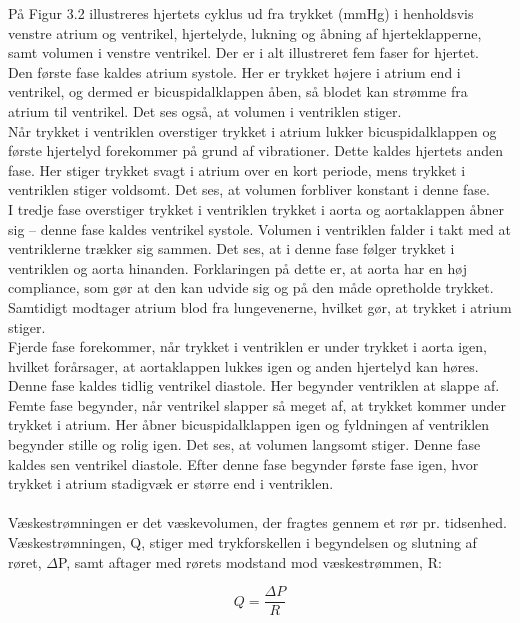 På Figur 3.2 illustreres hjertets cyklus ud fra trykket (mmHg) i henholdsvis venstre atrium og ventrikel, hjertelyde, lukning og åbning af hjerteklapperne, samt volumen i venstre ventrikel. Der er i alt illustreret fem faser for hjertet. \\
Den første fase kaldes atrium systole. Her er trykket højere i atrium end i ventrikel, og dermed er bicuspidalklappen åben, så blodet kan strømme fra atrium til ventrikel. Det ses også, at volumen i ventriklen stiger. \\
Når trykket i ventriklen overstiger trykket i atrium lukker bicuspidalklappen og første hjertelyd forekommer på grund af vibrationer. Dette kaldes hjertets anden fase. Her stiger trykket svagt i atrium over en kort periode, mens trykket i ventriklen stiger voldsomt. Det ses, at volumen forbliver konstant i denne fase. \\
I tredje fase overstiger trykket i ventriklen trykket i aorta og aortaklappen åbner sig – denne fase kaldes ventrikel systole. Volumen i ventriklen falder i takt med at ventriklerne trækker sig sammen. Det ses, at i denne fase følger trykket i ventriklen og aorta hinanden. Forklaringen på dette er, at aorta har en høj compliance, som gør at den kan udvide sig og på den måde opretholde trykket. Samtidigt modtager atrium blod fra lungevenerne, hvilket gør, at trykket i atrium stiger. \\
Fjerde fase forekommer, når trykket i ventriklen er under trykket i aorta igen, hvilket forårsager, at aortaklappen lukkes igen og anden hjertelyd kan høres. Denne fase kaldes tidlig ventrikel diastole. Her begynder ventriklen at slappe af. \\
Femte fase begynder, når ventrikel slapper så meget af, at trykket kommer under trykket i atrium. Her åbner bicuspidalklappen igen og fyldningen af ventriklen begynder stille og rolig igen. Det ses, at volumen langsomt stiger. Denne fase kaldes sen ventrikel diastole. Efter denne fase begynder første fase igen, hvor trykket i atrium stadigvæk er større end i ventriklen. 
\\\\
Væskestrømningen er det væskevolumen, der fragtes gennem et rør pr. tidsenhed. Væskestrømningen, Q, stiger med trykforskellen i begyndelsen og slutning af røret, $\Delta$P, samt aftager med rørets modstand mod væskestrømmen, R: 

\begin{equation}
Q = \frac{\Delta P}{R}
\end{equation}

